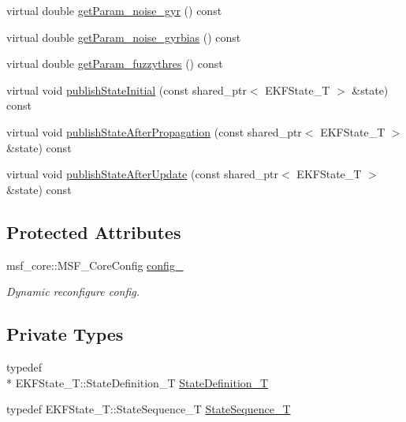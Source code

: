 \begin{DoxyCompactItemize}
virtual double \hyperlink{structmsf__core_1_1MSF__SensorManagerROS_aedf81899b9210ba2d869f1b66f4e6ee0}{get\-Param\-\_\-noise\-\_\-gyr} () const 
\item 
virtual double \hyperlink{structmsf__core_1_1MSF__SensorManagerROS_a5dad5d6ad078af02bf85ca5edd871a0b}{get\-Param\-\_\-noise\-\_\-gyrbias} () const 
\item 
virtual double \hyperlink{structmsf__core_1_1MSF__SensorManagerROS_a40d9507b8a2a513b70078583c4851995}{get\-Param\-\_\-fuzzythres} () const 
\item 
virtual void \hyperlink{structmsf__core_1_1MSF__SensorManagerROS_abde229602f1aeb393a2aad30ef413e12}{publish\-State\-Initial} (const shared\-\_\-ptr$<$ E\-K\-F\-State\-\_\-\-T $>$ \&state) const 
\item 
virtual void \hyperlink{structmsf__core_1_1MSF__SensorManagerROS_abcf566a97988f986deb36b5c7b2d8248}{publish\-State\-After\-Propagation} (const shared\-\_\-ptr$<$ E\-K\-F\-State\-\_\-\-T $>$ \&state) const 
\item 
virtual void \hyperlink{structmsf__core_1_1MSF__SensorManagerROS_a612d69d5e10b3d6de0eed6e4c6720afa}{publish\-State\-After\-Update} (const shared\-\_\-ptr$<$ E\-K\-F\-State\-\_\-\-T $>$ \&state) const 
\end{DoxyCompactItemize}
\subsection*{Protected Attributes}
\begin{DoxyCompactItemize}
\item 
msf\-\_\-core\-::\-M\-S\-F\-\_\-\-Core\-Config \hyperlink{structmsf__core_1_1MSF__SensorManagerROS_aa35b7b94cdf025302d7f980f2e68f413}{config\-\_\-}
\begin{DoxyCompactList}\small\item\em Dynamic reconfigure config. \end{DoxyCompactList}\end{DoxyCompactItemize}
\subsection*{Private Types}
\begin{DoxyCompactItemize}
\item 
typedef \\*
E\-K\-F\-State\-\_\-\-T\-::\-State\-Definition\-\_\-\-T \hyperlink{structmsf__core_1_1MSF__SensorManagerROS_ad964f1aec73a553dd897068561b1400a}{State\-Definition\-\_\-\-T}
\item 
typedef E\-K\-F\-State\-\_\-\-T\-::\-State\-Sequence\-\_\-\-T \hyperlink{structmsf__core_1_1MSF__SensorManagerROS_a292181458fad0c2db275b101e5e5fd03}{State\-Sequence\-\_\-\-T}
\end{DoxyCompactItemize}
